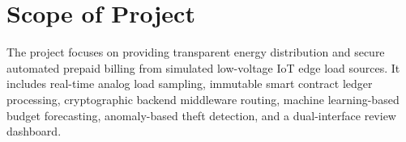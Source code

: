\section{Scope of Project}
The project focuses on providing transparent energy distribution and secure automated prepaid billing from simulated low-voltage IoT edge load sources. It includes real-time analog load sampling, immutable smart contract ledger processing, cryptographic backend middleware routing, machine learning-based budget forecasting, anomaly-based theft detection, and a dual-interface review dashboard.
